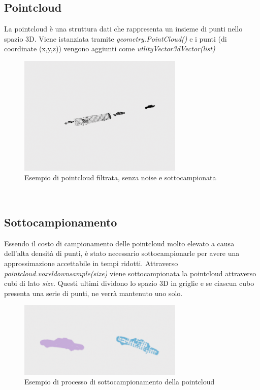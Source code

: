 \documentclass[italian]{report}
\begin{document}
\subsection{Pointcloud}
La pointcloud è una struttura dati che rappresenta un insieme di punti nello spazio 3D. Viene istanziata tramite \textit{geometry.PointCloud()} e i punti (di coordinate (x,y,z)) vengono aggiunti come \textit{utlityVector3dVector(list)}\\
\begin{figure}[H]
	\centering
	\includegraphics[width=0.7\textwidth]{Pointcloud}
	\footnotesize
	\caption{Esempio di pointcloud filtrata, senza noise e sottocampionata}
\end{figure}\\
\subsection{Sottocampionamento}
Essendo il costo di campionamento delle pointcloud molto elevato a causa dell'alta densità di punti, è stato necessario sottocampionarle per avere una approssimazione accettabile in tempi ridotti. Attraverso \textit{pointcloud.voxeldownsample(size)}  viene sottocampionata la pointcloud attraverso cubi di lato \textit{size}. Questi ultimi dividono lo spazio 3D in griglie e se ciascun cubo presenta una serie di punti, ne verrà mantenuto uno solo.
\begin{figure}[H]
	\centering
	\includegraphics[width=0.7\textwidth]{Voxel}
	\footnotesize
	\caption{Esempio di processo di sottocampionamento della pointcloud}
\end{figure}
\end{document}
